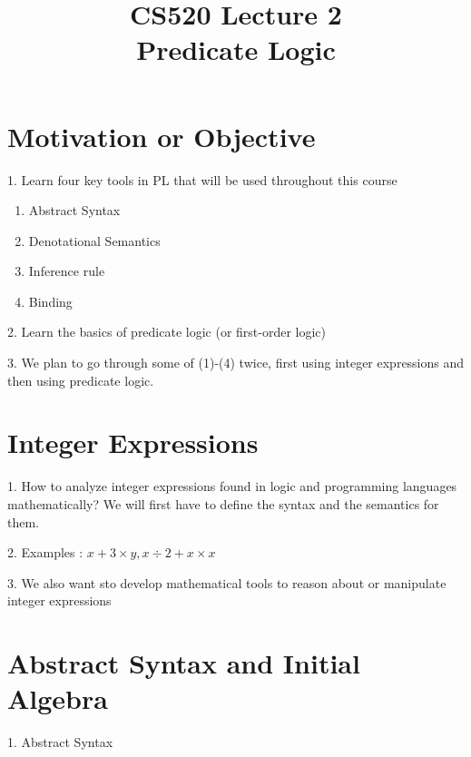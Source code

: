 \documentclass{report}[12pt]
\begin{document}
\setlength\parindent{0pt}

  {\topsep}{\topsep}%
  {\itshape}{}%
  {\bfseries}{}%
  {\newline}{}%

\theoremstyle{break}

\newtheorem{theorem}{Theorem}[section]
\newtheorem{definition}{Definition}
\newtheorem{proposition}{Proposition}
\newtheorem{corollary}{Corollary}
\newtheorem{lemma}{Lemma}
\newtheorem{example}{Example}
\newcommand{\nonterminal}[1]{\langle \text{#1}\rangle}
\newcommand{\rem}[0]{\text{ rem }}
\newcommand{\interp}[1]{\llbracket #1 \rrbracket}

\setcounter{chapter}{2}

\title{CS520 Lecture 2\\Predicate Logic}
\Large
\maketitle

\section{Motivation or Objective}
1. Learn four key tools in PL that will be used throughout this course

\begin{enumerate}
    \item Abstract Syntax
    \item Denotational Semantics
    \item Inference rule
    \item Binding
\end{enumerate}
2. Learn the basics of predicate logic (or first-order logic)

3. We plan to go through some of (1)-(4) twice, first using integer expressions and then using predicate logic.

\section{Integer Expressions}
1. How to analyze integer expressions found in logic and programming languages mathematically? We will first have to define the syntax and the semantics for them.

2. Examples : $x+3\times y, x\div 2 + x \times x$

3. We also want sto develop mathematical tools to reason about or manipulate integer expressions
\section{Abstract Syntax and Initial Algebra}
1. Abstract Syntax
\end{document}

